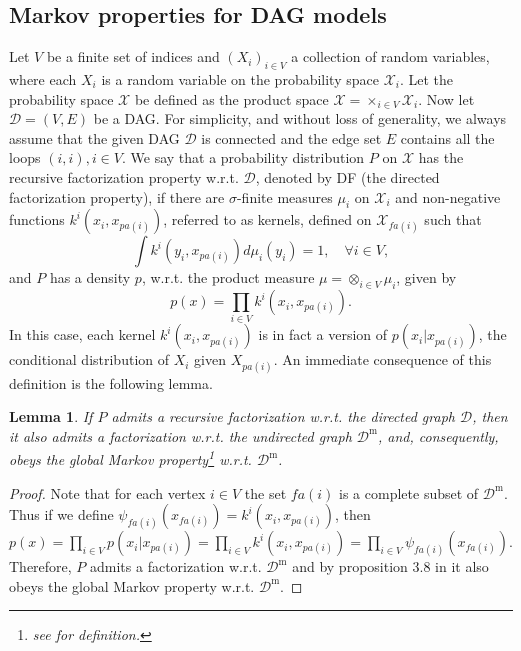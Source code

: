 \documentclass[12pt]{article}
\newcommand{\D}{\mathcal{D}}
\theoremstyle{plain}
\newtheorem{lemma}[theorem]{Lemma}
\theoremstyle{definition}
\theoremstyle{remark}
\begin{document}
\subsection*{Markov properties for DAG models}\label{sub:mpfdag}
Let $V$ be a finite set of indices and $(X_i)_{i\in V}$ a collection of random variables, where each $X_i$ is a random variable on the probability space $\mathcal{X}_i$. Let the probability space $\mathcal{X}$ be defined as the product space $\mathcal{X}=\times_{i\in V}\mathcal{X}_i$. Now let $\D=(V, E)$ be a DAG.  For simplicity, and without loss of generality, we always assume that the given DAG $\D$ is connected and the edge set $E$  contains all the loops $(i,i), i\in V$.  We say that a probability distribution  $P$  on  $\mathcal{X}$  has the recursive factorization property w.r.t. $\D$, denoted by  DF (the directed factorization property), if  there are  $\sigma$-finite  measures  $\mu_{i}$  on  $\mathcal{X}_i$  and non-negative functions   $k^i(x_i, x_{pa(i)})$, referred to as {kernels}, defined on   $\mathcal{X}_{fa(i)}$ such that
\[
\int k^i(y_i, x_{pa(i)})d\mu_i(y_i)=1,\quad\forall i\in V,
\]
and  $P$  has a density  $p$,  w.r.t.  the product measure  $\mu=\otimes_{i\in V}\mu_i$, given by
\[
p(x)=\prod_{i\in V}k^i(x_i,x_{pa(i)}).
\]
In this case, each kernel  $k^i(x_i,x_{pa(i)})$  is in fact a version of  $p(x_i|x_{pa(i)})$, the conditional distribution of $X_i$  given $X_{pa(i)}$.
An immediate consequence of this definition is the following lemma.

\begin{lemma}\cite{lauritzen96*}\label{dfimoralf}
If  $P$ admits a recursive factorization w.r.t. the directed graph $\D$, then it also admits a factorization w.r.t. the undirected graph  $\D^{\mathrm{m}}$,  and,  consequently, obeys the global Markov property\footnote{see \cite{lauritzen96*} for definition.} w.r.t. $\D^{\mathrm{m}}$.
\end{lemma}
\begin{proof}
Note that for each vertex $i\in V$ the set $fa(i)$ is a complete subset of $\D^{\mathrm{m}}$. Thus if we define  $\psi_{fa(i)}(x_{fa(i)})=k^{i}(x_{i}, x_{pa(i)})$, then  $p(x)= \prod_{i\in V}p(x_i|x_{pa(i)}) = \prod_{i\in V}k^{i}(x_i,x_{pa(i)}) = \prod_{i\in V}\psi_{fa(i)}(x_{fa(i)})$. Therefore, $P$ admits a factorization w.r.t. $\D^{\mathrm{m}}$ and by proposition 3.8 in \cite{lauritzen96*} it also obeys the global Markov property w.r.t. $\D^{\mathrm{m}}$.
\end{proof}
\end{document}
